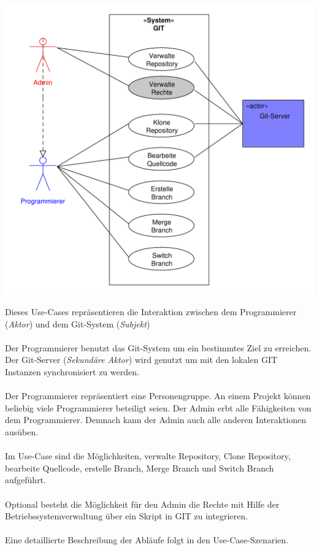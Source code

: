 \documentclass[a4paper]{article}
\begin{document}
\includegraphics[width=15cm]{Use-Case-Modell.pdf}	

Dieses Use-Cases repräsentieren die Interaktion zwischen dem Programmierer (\textit{Aktor}) und dem Git-System (\textit{Subjekt})\\  							%
\\ 														%
Der Programmierer benutzt das Git-System um ein bestimmtes Ziel zu erreichen. 
Der Git-Server (\textit{Sekundäre Aktor}) wird genutzt um mit den lokalen GIT Instanzen synchronisiert zu werden.\\
\\
Der Programmierer repräsentiert eine Personengruppe. An einem Projekt können beliebig viele Programmierer beteiligt seien.  
Der Admin erbt alle Fähigkeiten von dem Programmierer. Demnach kann der Admin auch alle anderen Interaktionen ausüben.  \\
\\
Im Use-Case sind die Möglichkeiten, verwalte Repository, \gls{Clone} Repository, bearbeite Quellcode, erstelle Branch, Merge Branch und \gls{Switch} Branch aufgeführt.\\\\Optional besteht die Möglichkeit für den Admin die Rechte mit Hilfe der Betriebssystemverwaltung über ein Skript in GIT zu integrieren.\\
\\
Eine detaillierte Beschreibung der Abläufe folgt in den Use-Case-Szenarien. 
\end{document}
